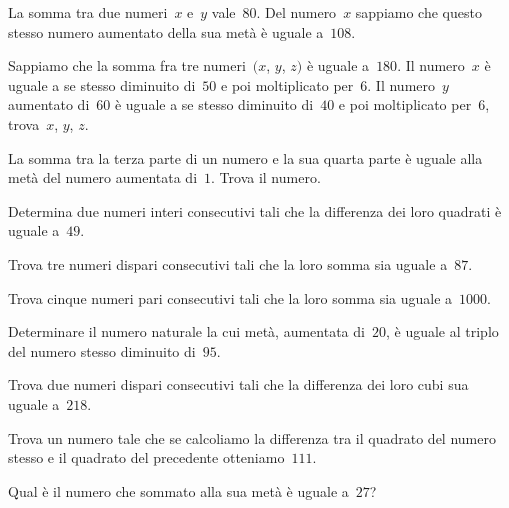 \begin{multicols}{2}
\begin{esercizio}[\Ast]
La somma tra due numeri~$x$ e~$y$ vale~$80$. Del numero~$x$ sappiamo che questo stesso numero aumentato della sua metà è uguale a~$108$.
\end{esercizio}

\begin{esercizio}[\Ast]
Sappiamo che la somma fra tre numeri~$(x$, $y$, $z)$ è uguale a~$180$. Il numero~$x$ è uguale a se stesso diminuito di~$50$ e poi moltiplicato per~$6$. 
Il numero~$y$ aumentato di~$60$ è uguale a se stesso diminuito di~$40$ e poi moltiplicato per~$6$, trova~$x$, $y$, $z$.
\end{esercizio}

\begin{esercizio}[\Ast]
La somma tra la terza parte di un numero e la sua quarta parte è uguale alla metà del numero aumentata di~$1$. Trova il numero.
\end{esercizio}

\begin{esercizio}
Determina due numeri interi consecutivi tali che la differenza dei loro quadrati è uguale a~$49$.
\end{esercizio}

\begin{esercizio}
Trova tre numeri dispari consecutivi tali che la loro somma sia uguale a~$87$.
\end{esercizio}

\begin{esercizio}
Trova cinque numeri pari consecutivi tali che la loro somma sia uguale a~$1000$.
\end{esercizio}

\begin{esercizio}[\Ast]
Determinare il numero naturale la cui metà, aumentata di~$20$, è uguale al triplo del numero stesso diminuito di~$95$.
\end{esercizio}

\begin{esercizio}[\Ast]
Trova due numeri dispari consecutivi tali che la differenza dei loro cubi sua uguale a~$218$.
\end{esercizio}

\begin{esercizio}[\Ast]
Trova un numero tale che se calcoliamo la differenza tra il quadrato del numero stesso e il quadrato del precedente otteniamo~$111$.
\end{esercizio}

\begin{esercizio}
Qual è il numero che sommato alla sua metà è uguale a~$27$?
\end{esercizio}


\end{multicols}
